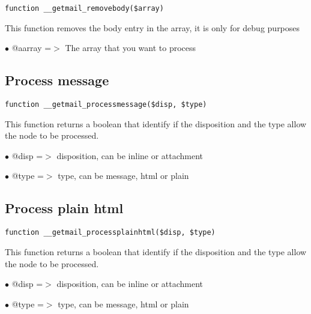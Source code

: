 \documentclass[a4paper]{book}
\begin{document}
\begin{lstlisting}
function __getmail_removebody($array)
\end{lstlisting}

This function removes the body entry in the array, it is only for debug purposes

\begin{compactitem}
\item[\color{myblue}$\bullet$] @aarray =$>$ The array that you want to process
\end{compactitem}

\hypertarget{toc532}{}
\subsection{Process message}

\begin{lstlisting}
function __getmail_processmessage($disp, $type)
\end{lstlisting}

This function returns a boolean that identify if the disposition and the type
allow the node to be processed.

\begin{compactitem}
\item[\color{myblue}$\bullet$] @disp =$>$ disposition, can be inline or attachment
\item[\color{myblue}$\bullet$] @type =$>$ type, can be message, html or plain
\end{compactitem}

\hypertarget{toc533}{}
\subsection{Process plain html}

\begin{lstlisting}
function __getmail_processplainhtml($disp, $type)
\end{lstlisting}

This function returns a boolean that identify if the disposition and the type
allow the node to be processed.

\begin{compactitem}
\item[\color{myblue}$\bullet$] @disp =$>$ disposition, can be inline or attachment
\item[\color{myblue}$\bullet$] @type =$>$ type, can be message, html or plain
\end{compactitem}
\end{document}

